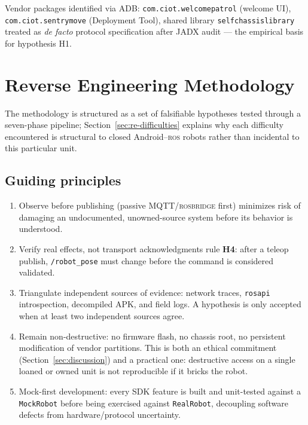 \documentclass[conference]{IEEEtran}
\newcommand{\ros}{\textsc{ros}}
\newcommand{\rosbridge}{\textsc{rosbridge}}
\newcommand{\rosapi}{\texttt{rosapi}}
\begin{document}
Vendor packages identified via ADB: \texttt{com.ciot.welcomepatrol} (welcome UI), \texttt{com.ciot.sentrymove} (Deployment Tool), shared library \texttt{selfchassislibrary} treated as \emph{de facto} protocol specification after JADX audit --- the empirical basis for hypothesis H1.

\section{Reverse Engineering Methodology}
\label{sec:re}

The methodology is structured as a set of falsifiable hypotheses tested through a seven-phase pipeline; Section~\ref{sec:re-difficulties} explains why each difficulty encountered is structural to closed Android--\ros{} robots rather than incidental to this particular unit.

\subsection{Guiding principles}

\begin{enumerate}[label=\textbf{P\arabic*.},leftmargin=1.4em]
\item Observe before publishing (passive MQTT/\rosbridge{} first) minimizes risk of damaging an undocumented, unowned-source system before its behavior is understood.
\item Verify real effects, not transport acknowledgments rule \textbf{H4}: after a teleop publish, \texttt{/robot\_pose} must change before the command is considered validated.
\item Triangulate independent sources of evidence: network traces, \rosapi{} introspection, decompiled APK, and field logs. A hypothesis is only accepted when at least two independent sources agree.
\item Remain non-destructive: no firmware flash, no chassis root, no persistent modification of vendor partitions. This is both an ethical commitment (Section~\ref{sec:discussion}) and a practical one: destructive access on a single loaned or owned unit is not reproducible if it bricks the robot.
\item Mock-first development: every SDK feature is built and unit-tested against a \texttt{MockRobot} before being exercised against \texttt{RealRobot}, decoupling software defects from hardware/protocol uncertainty.
\end{enumerate}
\end{document}

